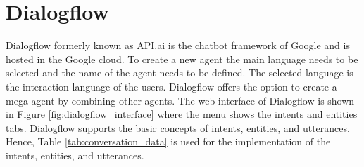 \section{Dialogflow}
Dialogflow\cite{dialogflow} formerly known as API.ai is the chatbot framework of Google and 
is hosted in the Google cloud.
To create a new agent the main language needs to be selected and the name of the agent needs to be defined.
The selected language is the interaction language of the users.
Dialogflow offers the option to create a mega agent by combining other agents.
The web interface of Dialogflow is shown in Figure \ref{fig:dialogflow_interface} where 
the menu shows the intents and entities tabs.
Dialogflow supports the basic concepts of intents, entities, and utterances.
Hence, Table \ref{tab:conversation_data} is used for the implementation 
of the intents, entities, and utterances.
